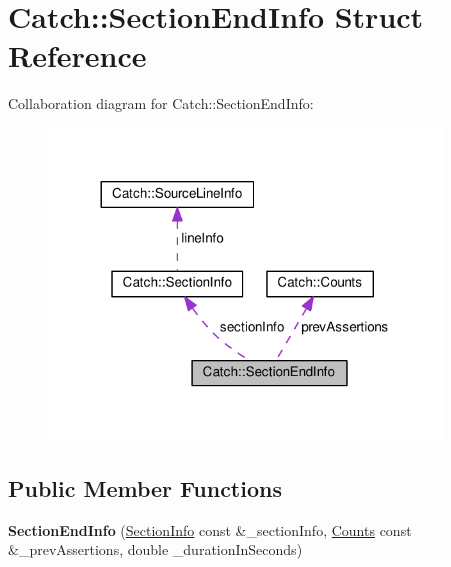 \hypertarget{structCatch_1_1SectionEndInfo}{}\section{Catch\+:\+:Section\+End\+Info Struct Reference}
\label{structCatch_1_1SectionEndInfo}


Collaboration diagram for Catch\+:\+:Section\+End\+Info\+:\nopagebreak
\begin{figure}[H]
\begin{center}
\leavevmode
\includegraphics[width=296pt]{structCatch_1_1SectionEndInfo__coll__graph}
\end{center}
\end{figure}
\subsection*{Public Member Functions}
\begin{DoxyCompactItemize}
\item 
{\bfseries Section\+End\+Info} (\hyperlink{structCatch_1_1SectionInfo}{Section\+Info} const \&\+\_\+section\+Info, \hyperlink{structCatch_1_1Counts}{Counts} const \&\+\_\+prev\+Assertions, double \+\_\+duration\+In\+Seconds)\hypertarget{structCatch_1_1SectionEndInfo_abc9381c7c22b6907317ec985ccaa6713}{}\label{structCatch_1_1SectionEndInfo_abc9381c7c22b6907317ec985ccaa6713}

\end{DoxyCompactItemize}
